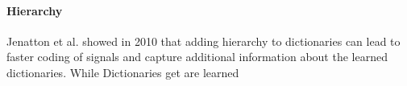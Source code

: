 
\paragraph{Hierarchy}%
Jenatton et al. showed in 2010\cite{Jenatton2010} that adding hierarchy to
dictionaries can lead to faster coding of signals and capture additional
information about the learned dictionaries. While Dictionaries get are learned 







